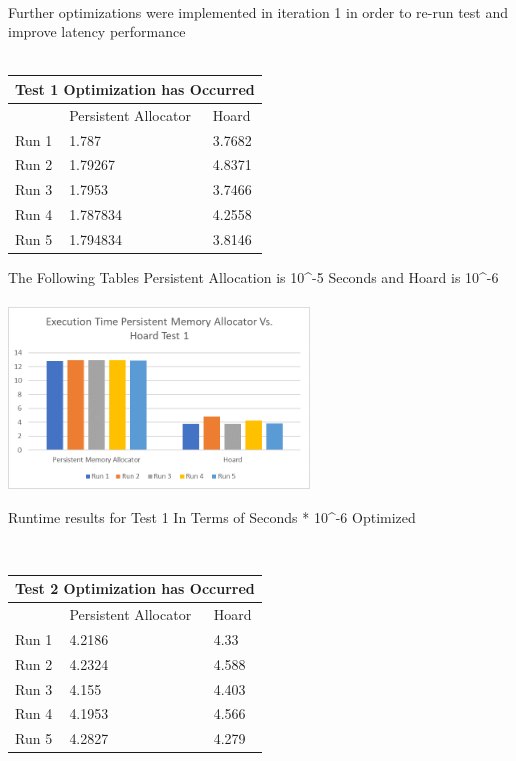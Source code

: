 \documentclass[conference]{IEEEtran}
\begin{document}
\\
Further optimizations were implemented in iteration 1 in order to re-run test and improve latency performance
\\
\\

\begin{tabular}{ |p{1cm}||p{3cm}|p{3cm}|  }
 \hline
 \multicolumn{3}{|c|}{Test 1 Optimization has Occurred} \\
 \hline
 & Persistent Allocator & Hoard \\
 \hline
 Run 1   &1.787    & 3.7682\\
 Run 2& 1.79267    &   4.8371  \\
 Run 3 &1.7953 &  3.7466 \\
 Run 4&1.787834& 4.2558\\
 Run 5& 1.794834  & 3.8146\\
 \hline
\end{tabular}
 The Following Tables Persistent Allocation is 10^-5 Seconds and Hoard is 10^-6\\
 
 \\
 \includegraphics[width=8cm]{Hoardgraph1.png}
\caption{Runtime results for Test 1 In Terms of Seconds * 10^-6 Optimized}
\label{fig6:Test 1 Optimized}
\\
 

\begin{tabular}{ |p{1cm}||p{3cm}|p{3cm}|  }
 \hline
 \multicolumn{3}{|c|}{Test 2 Optimization has Occurred} \\
 \hline
 & Persistent Allocator & Hoard \\
 \hline
 Run 1   &4.2186    & 4.33\\
 Run 2& 4.2324    &  4.588  \\
 Run 3 &4.155 &  4.403 \\
 Run 4&4.1953& 4.566\\
 Run 5& 4.2827  & 4.279\\
 \hline
\end{tabular}
\end{document}
